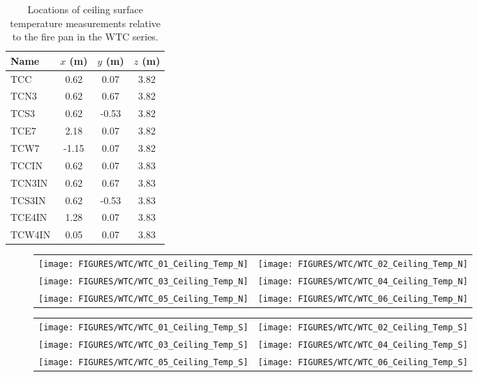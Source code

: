 \begin{table}[h!]
\caption[Ceiling surface measurement locations for the WTC series]{Locations of ceiling surface temperature measurements relative to the fire pan in the WTC series.}
\begin{center}
\begin{tabular}{|l|c|c|c|}
\hline
Name                & $x$ (m)   & $y$ (m)   & $z$ (m)   \\ \hline \hline
TCC                 & 0.62      & 0.07      & 3.82      \\ \hline
TCN3                & 0.62      & 0.67      & 3.82      \\ \hline
TCS3                & 0.62      & -0.53     & 3.82      \\ \hline
TCE7                & 2.18      & 0.07      & 3.82      \\ \hline
TCW7                & -1.15     & 0.07      & 3.82      \\ \hline \hline
TCCIN               & 0.62      & 0.07      & 3.83      \\ \hline
TCN3IN              & 0.62      & 0.67      & 3.83      \\ \hline
TCS3IN              & 0.62      & -0.53     & 3.83      \\ \hline
TCE4IN              & 1.28      & 0.07      & 3.83      \\ \hline
TCW4IN              & 0.05      & 0.07      & 3.83      \\ \hline
\end{tabular}
\end{center}
\label{WTC_Ceiling}
\end{table}

\newpage

\begin{figure}[p]
\begin{tabular*}{\textwidth}{l@{\extracolsep{\fill}}r}
\texttt{[image: FIGURES/WTC/WTC\_01\_Ceiling\_Temp\_N]} &
\texttt{[image: FIGURES/WTC/WTC\_02\_Ceiling\_Temp\_N]} \\
\texttt{[image: FIGURES/WTC/WTC\_03\_Ceiling\_Temp\_N]} &
\texttt{[image: FIGURES/WTC/WTC\_04\_Ceiling\_Temp\_N]} \\
\texttt{[image: FIGURES/WTC/WTC\_05\_Ceiling\_Temp\_N]} &
\texttt{[image: FIGURES/WTC/WTC\_06\_Ceiling\_Temp\_N]}
\end{tabular*}
\label{NIST_WTC_Ceiling_N}
\end{figure}

\begin{figure}[p]
\begin{tabular*}{\textwidth}{l@{\extracolsep{\fill}}r}
\texttt{[image: FIGURES/WTC/WTC\_01\_Ceiling\_Temp\_S]} &
\texttt{[image: FIGURES/WTC/WTC\_02\_Ceiling\_Temp\_S]} \\
\texttt{[image: FIGURES/WTC/WTC\_03\_Ceiling\_Temp\_S]} &
\texttt{[image: FIGURES/WTC/WTC\_04\_Ceiling\_Temp\_S]} \\
\texttt{[image: FIGURES/WTC/WTC\_05\_Ceiling\_Temp\_S]} &
\texttt{[image: FIGURES/WTC/WTC\_06\_Ceiling\_Temp\_S]}
\end{tabular*}
\label{NIST_WTC_Ceiling_S}
\end{figure}

